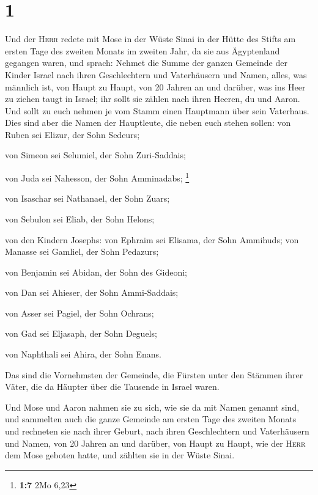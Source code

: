 \hypertarget{section}{%
\section{1}\label{section}}

 Und der \textsc{Herr} redete mit Mose in der Wüste Sinai
in der Hütte des Stifts am ersten Tage des zweiten Monats im zweiten
Jahr, da sie aus Ägyptenland gegangen waren, und sprach: 
Nehmet die Summe der ganzen Gemeinde der Kinder Israel nach ihren
Geschlechtern und Vaterhäusern und Namen, alles, was männlich ist, von
Haupt zu Haupt,  von 20 Jahren an und darüber, was ins
Heer zu ziehen taugt in Israel; ihr sollt sie zählen nach ihren Heeren,
du und Aaron.  Und sollt zu euch nehmen je vom Stamm einen
Hauptmann über sein Vaterhaus.  Dies sind aber die Namen
der Hauptleute, die neben euch stehen sollen: von Ruben sei Elizur, der
Sohn Sedeurs;

 von Simeon sei Selumiel, der Sohn Zuri-Saddais;

 von Juda sei Nahesson, der Sohn Amminadabs; \footnote{\textbf{1:7}
  2Mo 6,23}

 von Isaschar sei Nathanael, der Sohn Zuars;

 von Sebulon sei Eliab, der Sohn Helons;

 von den Kindern Josephs: von Ephraim sei Elisama, der
Sohn Ammihuds; von Manasse sei Gamliel, der Sohn Pedazurs;

 von Benjamin sei Abidan, der Sohn des Gideoni;

 von Dan sei Ahieser, der Sohn Ammi-Saddais;

 von Asser sei Pagiel, der Sohn Ochrans;

 von Gad sei Eljasaph, der Sohn Deguels;

 von Naphthali sei Ahira, der Sohn Enans.

 Das sind die Vornehmsten der Gemeinde, die Fürsten unter
den Stämmen ihrer Väter, die da Häupter über die Tausende in Israel
waren.

 Und Mose und Aaron nahmen sie zu sich, wie sie da mit
Namen genannt sind,  und sammelten auch die ganze
Gemeinde am ersten Tage des zweiten Monats und rechneten sie nach ihrer
Geburt, nach ihren Geschlechtern und Vaterhäusern und Namen, von 20
Jahren an und darüber, von Haupt zu Haupt,  wie der
\textsc{Herr} dem Mose geboten hatte, und zählten sie in der Wüste
Sinai.

